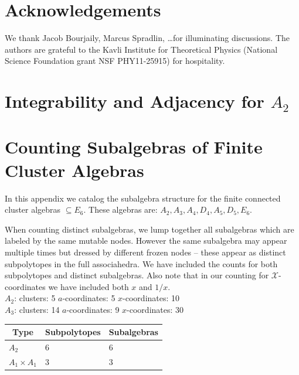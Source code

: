 \documentclass[11pt]{article}
\def\xcoords{$\mathcal{X}$-coordinates }
\def\pdfeq#1{\texorpdfstring{$#1$}{a}}
\begin{document}
\section*{Acknowledgements}

We thank Jacob Bourjaily, Marcus Spradlin, \dots for illuminating discussions. The authors are grateful to the Kavli Institute for Theoretical Physics (National Science Foundation grant NSF PHY11-25915) for hospitality. 


\appendix

\section{Integrability and Adjacency for \pdfeq{A_2}}  \label{appendix:integrable_A2}

\section{Counting Subalgebras of Finite Cluster Algebras}\label{appendix:subalgebras}
In this appendix we catalog the subalgebra structure for the finite connected cluster algebras \(\subseteq E_6\). These algebras are: \(A_2, A_3, A_4, D_4, A_5, D_5, E_6\).

When counting distinct subalgebras, we lump together all subalgebras which are labeled by the same mutable nodes. However the same subalgebra may appear multiple times but dressed by different frozen nodes -- these appear as distinct subpolytopes in the full associahedra. We have included the counts for both subpolytopes and distinct subalgebras. Also note that in our counting for \xcoords we have included both $x$ and $1/x$.\\ 

{\Large\underline{\(A_2\)}:} \quad clusters: 5 \qquad $a$-coordinates: 5 \qquad $x$-coordinates: 10 \\


{\Large\underline{\(A_3\)}:} \quad clusters: 14 \qquad \(a\)-coordinates: 9 \qquad \(x\)-coordinates: 30 \\

\begin{tabular}{ | l | l | l |}
\multicolumn{1}{c}{Type} &  \multicolumn{1}{c}{Subpolytopes}  &  \multicolumn{1}{c}{Subalgebras} \\
\hline \(A_2\) & 6 & 6 \\ 
\hline \(A_1 \times A_1\) & 3 & 3 \\ 
\hline
\end{tabular} \\ \\
\end{document}
